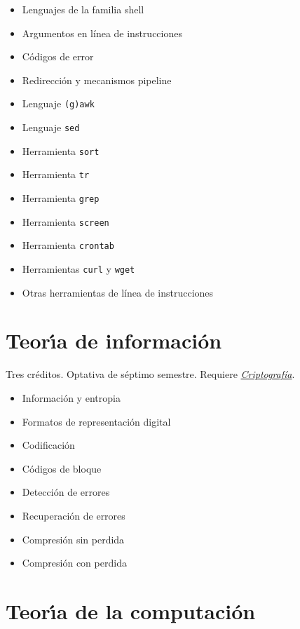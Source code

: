 \documentclass{article}
\begin{document}
\begin{multicols}{4}
\begin{itemize}
\item{Lenguajes de la familia shell}
\item{Argumentos en l\'{i}nea de instrucciones}
\item{C\'{o}digos de error}
\item{Redirecci\'{o}n y mecanismos pipeline}
\item{Lenguaje \texttt{(g)awk}}
\item{Lenguaje \texttt{sed}}
\item{Herramienta \texttt{sort}}  
\item{Herramienta \texttt{tr}}
\item{Herramienta \texttt{grep}}
\item{Herramienta \texttt{screen}}
\item{Herramienta \texttt{crontab}}
\item{Herramientas \texttt{curl} y \texttt{wget}}  
\item{Otras herramientas de l\'{i}nea de instrucciones}
\end{itemize}

\newpage

\hypertarget{tdi}{\section*{Teor\'{\i}a de informaci\'{o}n}}

Tres cr\'{e}ditos. Optativa de s\'{e}ptimo semestre. Requiere
\hyperlink{cr}{\em Criptograf\'{i}a}.

\begin{itemize}
\item{Informaci\'{o}n y entropia}
\item{Formatos de representaci\'{o}n digital}
\item{Codificaci\'{o}n}
\item{C\'{o}digos de bloque}
\item{Detecci\'{o}n de errores}
\item{Recuperaci\'{o}n de errores}
\item{Compresi\'{o}n sin perdida}
\item{Compresi\'{o}n con perdida}
\end{itemize}

\vfill\null \columnbreak

\hypertarget{tdc}{\section*{Teor\'{\i}a de la computaci\'{o}n}}


\end{multicols}
\end{document}
